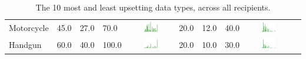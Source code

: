 \begin{table}[t]
\begin{center}
\begin{tabular}{| p{2cm} | p{1cm} | p{1cm} | p{1cm} | c | p{2cm} | p{1cm} | p{1cm} | p{1cm} | c |}
Motorcycle & 45.0 & 27.0 & 70.0 & \includegraphics[width = 2cm, height = 0.5cm]{tables/MotorcycleRisk}  & 20.0 & 12.0 & 40.0 & \includegraphics[width = 2cm, height = 0.5cm]{tables/MotorcycleBenefit} \\ 
Handgun & 60.0 & 40.0 & 100.0 & \includegraphics[width = 2cm, height = 0.5cm]{tables/HandgunRisk} & 20.0 & 10.0 & 30.0 & \includegraphics[width = 2cm, height = 0.5cm]{tables/HandgunBenefit} \\ 


\hline
\end{tabular}
\caption{The 10 most and least upsetting data types, across all recipients.}
\label{top10}
\end{center}
\end{table}
